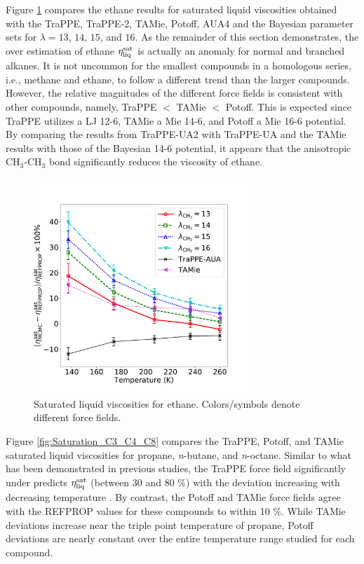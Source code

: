 \documentclass[preprint,review,12pt]{elsarticle}
\begin{document}
	
	Figure \ref{fig:Saturation_Ethane} compares the ethane results for saturated liquid viscosities obtained with the TraPPE, TraPPE-2, TAMie, Potoff, AUA4 and the Bayesian parameter sets for $\lambda = 13$, $14$, $15$, and $16$. As the remainder of this section demonstrates, the over estimation of ethane $\eta_{\rm liq}^{\rm sat}$ is actually an anomaly for normal and branched alkanes. It is not uncommon for the smallest compounds in a homologous series, i.e., methane and ethane, to follow a different trend than the larger compounds. However, the relative magnitudes of the different force fields is consistent with other compounds, namely, TraPPE $<$ TAMie $<$ Potoff. This is expected since TraPPE utilizes a LJ 12-6, TAMie a Mie 14-6, and Potoff a Mie 16-6 potential. By comparing the results from TraPPE-UA2 with TraPPE-UA and the TAMie results with those of the Bayesian 14-6 potential, it appears that the anisotropic CH$_3$-CH$_3$ bond significantly reduces the viscosity of ethane.  
	
	\begin{figure}[htb!]
		\centering
		\includegraphics[width=3.2in]{Ethane_eta_MCMC.pdf}
		\caption{Saturated liquid viscosities for ethane. Colors/symbols denote different force fields.}
		\label{fig:Saturation_Ethane}
	\end{figure} 
	
	Figure \ref{fig:Saturation_C3_C4_C8} compares the TraPPE, Potoff, and TAMie saturated liquid viscosities for propane, \textit{n}-butane, and \textit{n}-octane. Similar to what has been demonstrated in previous studies, the TraPPE force field significantly under predicts $\eta_{\rm liq}^{\rm sat}$ (between 30 and 80 \%) with the deviation increasing with decreasing temperature \cite{Gordon2006,Nieto2006}. By contrast, the Potoff and TAMie force fields agree with the REFPROP values for these compounds to within 10 \%. While TAMie deviations increase near the triple point temperature of propane, Potoff deviations are nearly constant over the entire temperature range studied for each compound. 
	
\end{document}
